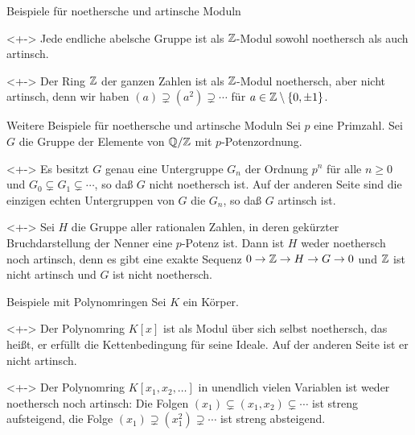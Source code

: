 \begin{frame}{Beispiele für noethersche und artinsche Moduln}
	\begin{example}<+->
		Jede endliche abelsche Gruppe ist als \(\mathbb Z\)-Modul sowohl
		noethersch als auch artinsch.
	\end{example}
	\begin{example}<+->
		Der Ring \(\mathbb Z\) der ganzen Zahlen ist als \(\mathbb Z\)-Modul
		noethersch, aber nicht artinsch, denn wir haben
		\((a) \supsetneq (a^2) \supsetneq \dotsb\) für \(a \in \mathbb Z
		\setminus \{0, \pm 1\}\).
	\end{example}
\end{frame}

\begin{frame}{Weitere Beispiele für noethersche und artinsche Moduln}
	Sei \(p\) eine Primzahl. Sei \(G\) die Gruppe der Elemente von
	\(\mathbb Q/\mathbb Z\) mit \(p\)-Potenzordnung. 
	\begin{example}<+->
		Es besitzt \(G\) genau
		eine Untergruppe \(G_n\) der Ordnung \(p^n\) für alle \(n \ge 0\)
		und \(G_0 \subsetneq G_1 \subsetneq \dotsb\), so daß \(G\) nicht 
		noethersch ist. Auf der anderen Seite sind die einzigen echten
		Untergruppen von \(G\) die \(G_n\), so daß \(G\) artinsch ist.
	\end{example}
	\begin{example}<+->
		Sei \(H\) die Gruppe aller rationalen Zahlen, in deren gekürzter
		Bruchdarstellung der Nenner eine \(p\)-Potenz ist. Dann ist \(H\)
		weder noethersch noch artinsch, denn es gibt eine exakte Sequenz
		\(0 \to \mathbb Z \to H \to G \to 0\) und \(\mathbb Z\) ist nicht artinsch
		und \(G\) ist nicht noethersch.
	\end{example}
\end{frame}

\begin{frame}{Beispiele mit Polynomringen}
	Sei \(K\) ein Körper.
	\begin{example}<+->
		Der Polynomring \(K[x]\) ist als Modul über sich
		selbst noethersch, das heißt, er erfüllt die Kettenbedingung für seine
		Ideale. Auf der anderen Seite ist er nicht artinsch.
	\end{example}
	\begin{example}<+->
		Der Polynomring \(K[x_1, x_2, \dotsc]\) in unendlich vielen Variablen
		ist weder noethersch noch artinsch: Die Folgen
		\((x_1) \subsetneq (x_1, x_2) \subsetneq \dotsb\) ist streng aufsteigend,
		die Folge \((x_1) \supsetneq (x_1^2) \supsetneq \dotsb\) ist streng
		absteigend.
	\end{example}
\end{frame}

